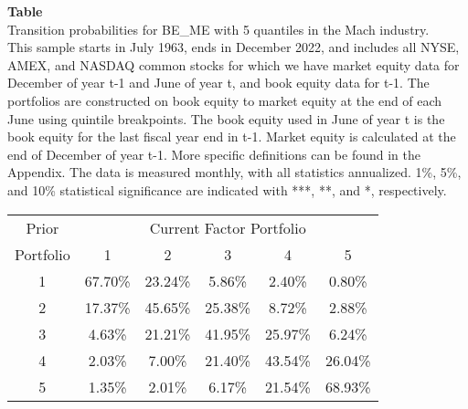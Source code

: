 \begin{table*}[ht!]
\raggedright
{}
\label{tab: transition_probs_BE_ME_Mach_with_5_quantiles}
\textbf{Table \thetable} \\
Transition probabilities for BE_ME with 5 quantiles in the Mach industry. \\
\hspace*{1em}This sample starts in July 1963, ends in December 2022, and includes all NYSE, AMEX, and NASDAQ common stocks for which we have market equity data for December of year t-1 and June of year t, and book equity data for t-1. The portfolios are constructed on book equity to market equity at the end of each June using quintile breakpoints.  The book equity used in June of year t is the book equity for the last fiscal year end in t-1.  Market equity is calculated at the end of December of year t-1.  More specific definitions can be found in the Appendix.  The data is measured monthly, with all statistics annualized.  1\%, 5\%, and 10\% statistical significance are indicated with ***, **, and *, respectively. \\
\vspace{0.5em}
\centering
\begin{adjustbox}{max width=\textwidth}
\begin{tabular}{@{}cccccc@{}}
\toprule
Prior & \multicolumn{5}{c}{Current Factor Portfolio} \\
Portfolio & 1 & 2 & 3 & 4 & 5 \\
\midrule
1 & 67.70\% & 23.24\% & 5.86\% & 2.40\% & 0.80\% \\
2 & 17.37\% & 45.65\% & 25.38\% & 8.72\% & 2.88\% \\
3 & 4.63\% & 21.21\% & 41.95\% & 25.97\% & 6.24\% \\
4 & 2.03\% & 7.00\% & 21.40\% & 43.54\% & 26.04\% \\
5 & 1.35\% & 2.01\% & 6.17\% & 21.54\% & 68.93\% \\
\bottomrule
\end{tabular}
\end{adjustbox}
\end{table*}